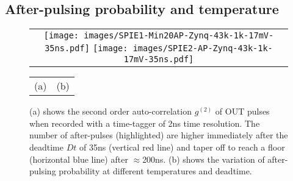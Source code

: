 \subsection{After-pulsing probability and temperature}


 
\begin{figure} [ht]
\begin{center}
\begin{tabular}{c} 
\texttt{[image: images/SPIE1-Min20AP-Zynq-43k-1k-17mV-35ns.pdf]}
\texttt{[image: images/SPIE2-AP-Zynq-43k-1k-17mV-35ns.pdf]}
\end{tabular}
\begin{tabularx}{\linewidth}{>{\centering\arraybackslash}X >{\centering\arraybackslash}X}
    (a) & (b) \\
\end{tabularx}
\end{center}
\caption[] 
{ \label{fig:afterpulse} 
(a) shows the second order auto-correlation $g^{(2)}$ of OUT pulses when recorded with a time-tagger of 2ns time resolution. The number of after-pulses (highlighted) are higher immediately after the deadtime $Dt$ of 35ns (vertical red line) and taper off to reach a floor (horizontal blue line) after $\approx$200ns. (b) shows the variation of after-pulsing probability at different temperatures and deadtime. 
}
\end{figure}

